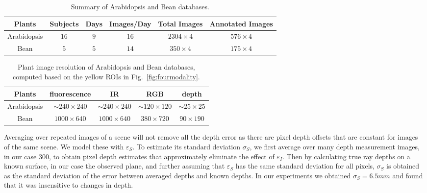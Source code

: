 \begin{table*}[t!]
\begin{center}
\caption{Summary of Arabidopsis and Bean databases.}
\label{tab:stat}
\begin{tabular}{c|c|c|c|c|c}
\hline
Plants & Subjects & Days & Images/Day & Total Images & Annotated Images \\
\hline
Arabidopsis & $16$ & $9$ & $16$ & $2304\times 4$ & $576\times 4$ \\
\hline
Bean & $5$ & $5$ & $14$ & $350\times 4$ & $175\times 4$ \\
\hline
\end{tabular}
\end{center}
\end{table*}



\begin{table*}
\begin{center}
\caption{Plant image resolution of Arabidopsis and Bean databases, computed based on the yellow ROIs in Fig.~\ref{fig:fourmodality}.}
\label{tab:resolution}
\begin{tabular}{c|c|c|c|c}
\hline
Plants & fluorescence & IR & RGB & depth \\
\hline
Arabidopsis & $\sim$$240\times240$ & $\sim$$240\times240$ & $\sim$$120\times120$ & $\sim$$25\times25$ \\
Bean & $1000\times640$ & $1000\times640$ & $380\times720$ & $90\times190$ \\
\hline
\end{tabular}
\end{center}
\end{table*}

Averaging over repeated images of a scene will not remove all the depth error as there are pixel depth offsets that are constant for images of the same scene. 
We model these with $\varepsilon_S$. 
To estimate its standard deviation $\sigma_S$, we first average over many depth measurement images, in our case $300$, to obtain pixel depth estimates that approximately eliminate the effect of $\varepsilon_I$. Then by calculating true ray depths on a known surface, in our case the observed plane, and further assuming that $\varepsilon_S$ has the same standard deviation for all pixels, $\sigma_S$ is obtained as the standard deviation of the error between averaged depths and known depths. In our experiments we obtained $\sigma_S=6.5mm$ and found that it was insensitive to changes in depth.

